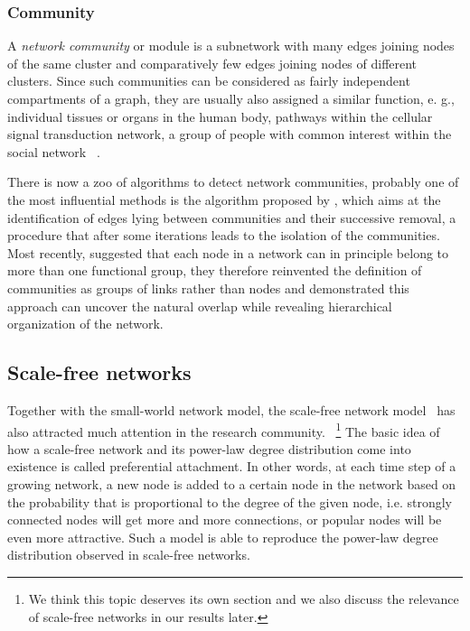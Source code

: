 \subsubsection{Community}
A \emph{network community} or module is a subnetwork with many edges joining
nodes of the same cluster and comparatively few edges joining nodes of 
different clusters. Since such communities can be considered as fairly 
independent compartments of a graph, they are usually also assigned 
a similar function, e. g., individual tissues or organs in the human body,
pathways within the cellular signal transduction network, a group of people
with common interest within the social network~%
\citep{Fortunato2010,Newman2012}.

There is now a zoo of algorithms to detect network communities, probably one
of the most influential methods is the algorithm proposed by \cite{Girvan2002},
which aims at the identification of edges lying between communities and their 
successive removal, a procedure that after some iterations
leads to the isolation of the communities. Most recently, \cite{Ahn2010b} 
suggested that each node in a network can in principle belong to more than 
one functional group, they therefore reinvented the definition of communities 
as groups of links rather than nodes and demonstrated this approach can uncover
the natural overlap while revealing hierarchical organization of the network.

\subsection{Scale-free networks}
\label{sec:scale_free}
Together with the small-world network model, the scale-free network model~%
\citep{Barabasi1999} has
also attracted much attention in the research community.~%
\footnote{We think this topic deserves its own section and we also discuss
the relevance of scale-free networks in our results later.}
The basic idea of 
how a scale-free network and its power-law degree distribution come into
existence is called preferential attachment. In other words, at each time
step of a growing network, a new node is added to a certain node in the 
network based on the probability that is proportional to the degree of the
given node, i.e. strongly connected nodes will get more and more connections, or
popular nodes will be even more attractive. Such a model is able to reproduce
the power-law degree distribution observed in scale-free networks.


